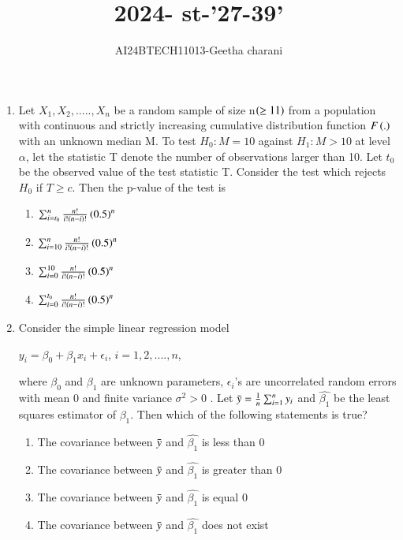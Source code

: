 \documentclass[journal,12pt,onecolumn]{IEEEtran}
\theoremstyle{remark}
\begin{document}

\vspace{3cm}

\title{2024- st-'27-39'}
\author{AI24BTECH11013-Geetha charani}
\maketitle
\bigskip

\renewcommand{\thefigure}{\theenumi}
\renewcommand{\thetable}{\theenumi}
\begin{enumerate}
\item Let $X_1,X_2,.....,X_n$ be a random sample of size n$\left(\geq 11\right)$ from a population with continuous and strictly increasing cumulative distribution function $F\left(.\right)$ with an unknown median M. To test $H_0 : M = 10$ against $H_1 : M > 10$ at level $\alpha$, let the statistic T denote the number of observations larger than 10. Let $t_0$ be the observed value of the test statistic T. Consider the test which rejects $H_0$ if $T \geq c$. Then the p-value of the test is 
\begin{enumerate}
    \item $\sum_{i=t_0}^n \frac{n!}{i!\left(n-i\right)!}\left(0.5\right)^n$
    \item $\sum_{i=10}^n \frac{n!}{i!\left(n-i\right)!}\left(0.5\right)^n$
    \item $\sum_{i=0}^{10} \frac{n!}{i!\left(n-i\right)!}\left(0.5\right)^n$
    \item $\sum_{i=0}^{t_0} \frac{n!}{i!\left(n-i\right)!}\left(0.5\right)^n$
\end{enumerate}
\item Consider the simple linear regression model 
\begin{center}
    $y_i = {\beta}_0 + {\beta}_1 x_i + {\epsilon}_i$, $i=1,2,....,n$, 
\end{center}
where ${\beta}_0$ and ${\beta}_1$ are unknown parameters, ${\epsilon}_i$'s
 are uncorrelated random errors with mean 0 and finite variance ${\sigma}^2 > 0$ . Let $\Bar{y}= \frac{1}{n}\sum_{i=1}^n y_i$ and $\hat{\beta_1}$ be the least squares estimator of $\beta_1$. Then which of the following statements is true? 
 \begin{enumerate}
     \item The covariance between $\Bar{y}$ and $\hat{\beta_1}$ is less than 0
     \item The covariance between $\Bar{y}$ and $\hat{\beta_1}$ is greater than 0
     \item The covariance between $\Bar{y}$ and $\hat{\beta_1}$ is equal 0
     \item The covariance between $\Bar{y}$ and $\hat{\beta_1}$ does not exist

\end{enumerate}
\end{enumerate}
\end{document}
